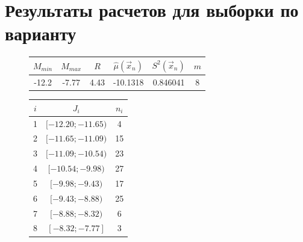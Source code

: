\chapter{Результаты расчетов для выборки по варианту}


\begin{figure}[H]
	\centering
	\begin{tabular}{|c|c|c|c|c|c|}
		\hline
		$M_{min}$ & $M_{max}$ & $R$ & $\hat \mu (\vec x_n)$ & $S^2(\vec x_n)$ & $m$\\
		\hline
		-12.2 & -7.77 & 4.43 & -10.1318 & 0.846041 & 8\\
		\hline
	\end{tabular}
\end{figure}

\begin{figure}[H]
	\centering
	\begin{tabular}{|c|c|c|}
		\hline
		$i$ & $J_i$ & $n_i$\\
		\hline
		1 & $[-12.20; -11.65)$ & 4\\
		\hline
		2 & $[-11.65; -11.09)$ & 15\\
		\hline
		3 & $[-11.09; -10.54)$ & 23\\
		\hline
		4 & $[-10.54;  -9.98)$ & 27\\
		\hline
		5 & $[ -9.98;  -9.43)$ & 17\\
		\hline
		6 & $[ -9.43;  -8.88)$ & 25\\
		\hline 
		7 & $[ -8.88;  -8.32)$  & 6\\
		\hline
		8 &  $[ -8.32;  -7.77]$ & 3\\
		\hline
	\end{tabular}
\end{figure}

